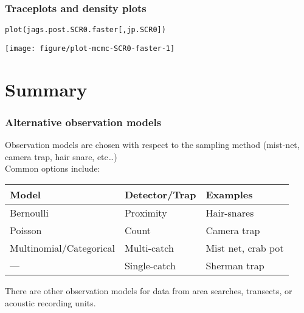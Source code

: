 \documentclass[color=usenames,dvipsnames]{beamer}\usepackage[]{graphicx}\usepackage[]{xcolor}
\makeatletter
\newcommand{\hldef}[1]{\textcolor[rgb]{0,0,0}{#1}}%
\newcommand{\hlkwd}[1]{\textcolor[rgb]{0.004,0.004,0.506}{#1}}%
\newenvironment{kframe}{%
 \def\at@end@of@kframe{}%
 \ifinner\ifhmode%
  \def\at@end@of@kframe{\end{minipage}}%
  \begin{minipage}{\columnwidth}%
 \fi\fi%
 \def\FrameCommand##1{\hskip\@totalleftmargin \hskip-\fboxsep
 \colorbox{shadecolor}{##1}\hskip-\fboxsep
     \hskip-\linewidth \hskip-\@totalleftmargin \hskip\columnwidth}%
 \MakeFramed {\advance\hsize-\width
   \@totalleftmargin\z@ \linewidth\hsize
   \@setminipage}}%
 {\par\unskip\endMakeFramed%
 \at@end@of@kframe}
\newenvironment{knitrout}{}{} %
\makeatother
\begin{document}
\begin{frame}[fragile]
  \frametitle{Traceplots and density plots}
\begin{knitrout}\footnotesize
{}\color{fgcolor}\begin{kframe}
\begin{alltt}
\hlkwd{plot}\hldef{(jags.post.SCR0.faster[,jp.SCR0])}
\end{alltt}
\end{kframe}

{\centering \texttt{[image: figure/plot-mcmc-SCR0-faster-1]} 

}


\end{knitrout}
\end{frame}


\section{Summary}



\begin{frame}
  \frametitle{Alternative observation models}
  Observation models are chosen with respect to the sampling
      method (mist-net, camera trap, hair snare, etc\dots) \\
  \pause \vfill
  Common options include:
  \centering
    \begin{tabular}{lll}
      \hline
      Model       & Detector/Trap     & Examples           \\
      \hline
      Bernoulli   & Proximity    & Hair-snares        \\
      Poisson     & Count        & Camera trap        \\
      Multinomial/Categorical & Multi-catch  & Mist net, crab pot \\
      ---          & Single-catch & Sherman trap       \\
      \hline
    \end{tabular}
  \pause \vfill
  There are other observation models for data from area searches,
  transects, or acoustic recording units.
\end{frame}
\end{document}
